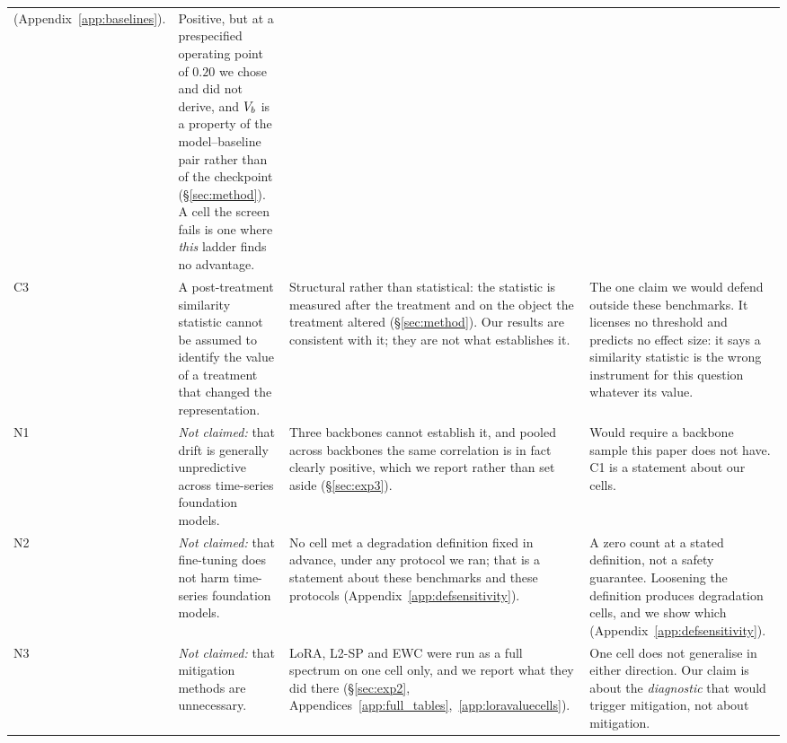 \begin{table}[!htbp]
\begin{tabular}{@{}p{}p{}p{}p{}@{}}
     (Appendix~\ref{app:baselines}).
   & Positive, but at a prespecified operating point of $0.20$ we chose and did
     not derive, and $V_{b}$ is a property of the model--baseline pair rather
     than of the checkpoint (\S\ref{sec:method}).  A cell the screen fails is one
     where \emph{this} ladder finds no advantage. \\
\addlinespace
C3 & A post-treatment similarity statistic cannot be assumed to identify the
     value of a treatment that changed the representation.
   & Structural rather than statistical: the statistic is measured after the
     treatment and on the object the treatment altered
     (\S\ref{sec:method}).  Our results are consistent with it; they are not what
     establishes it.
   & The one claim we would defend outside these benchmarks.  It licenses no
     threshold and predicts no effect size: it says a similarity statistic is
     the wrong instrument for this question whatever its value. \\
\midrule
N1 & \emph{Not claimed:} that drift is generally unpredictive across time-series
     foundation models.
   & Three backbones cannot establish it, and pooled across backbones the same
     correlation is in fact clearly positive, which we report rather than set
     aside (\S\ref{sec:exp3}).
   & Would require a backbone sample this paper does not have.  C1 is a
     statement about our cells. \\
\addlinespace
N2 & \emph{Not claimed:} that fine-tuning does not harm time-series foundation
     models.
   & No cell met a degradation definition fixed in advance, under any protocol we
     ran; that is a statement about these benchmarks and these protocols
     (Appendix~\ref{app:defsensitivity}).
   & A zero count at a stated definition, not a safety guarantee.  Loosening the
     definition produces degradation cells, and we show which
     (Appendix~\ref{app:defsensitivity}). \\
\addlinespace
N3 & \emph{Not claimed:} that mitigation methods are unnecessary.
   & LoRA, L2-SP and EWC were run as a full spectrum on one cell only, and we
     report what they did there (\S\ref{sec:exp2},
     Appendices~\ref{app:full_tables},~\ref{app:loravaluecells}).
   & One cell does not generalise in either direction.  Our claim is about the
     \emph{diagnostic} that would trigger mitigation, not about mitigation. \\
\bottomrule
\end{tabular}
\end{table}

